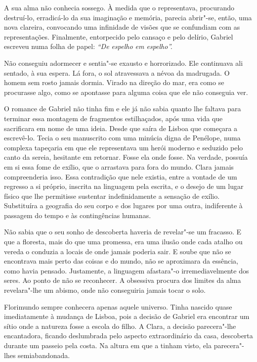 A sua alma não conhecia sossego. À medida que o representava, procurando
destruí-lo, erradicá-lo da sua imaginação e memória, parecia abrir"-se,
então, uma nova clareira, convocando uma infinidade de visões que se
confundiam com as representações. Finalmente, entorpecido pelo cansaço e
pelo delírio, Gabriel escreveu numa folha de papel: \emph{``De espelho
em espelho''.}

Não conseguiu adormecer e sentia"-se exausto e horrorizado. Ele
continuava ali sentado, à sua espera. Lá fora, o sol atravessava a névoa
da madrugada. O homem sem rosto jamais dormia. Virado na direção do
mar, era como se procurasse algo, como se apontasse para alguma coisa
que ele não conseguia ver.

O romance de Gabriel não tinha fim e ele já não sabia quanto lhe faltava
para terminar essa montagem de fragmentos estilhaçados, após uma vida
que sacrificara em nome de uma ideia. Desde que saíra de Lisboa que
começara a escrevê-lo. Tecia o seu manuscrito com uma minúcia digna de
Penélope, numa complexa tapeçaria em que ele representava um herói
moderno e seduzido pelo canto da sereia, hesitante em retornar. Fosse
ela onde fosse. Na verdade, possuía em si essa fome de exílio, que o
arrastava para fora do mundo. Clara jamais compreenderia isso. Essa
contradição que nele existia, entre a vontade de um regresso a si
próprio, inscrita na linguagem pela escrita, e o desejo de um lugar
físico que lhe permitisse sustentar indefinidamente a sensação de
exílio. Substituíra a geografia do seu corpo e dos lugares por uma
outra, indiferente à passagem do tempo e às contingências humanas.

Não sabia que o seu sonho de descoberta haveria de revelar"-se um
fracasso. E que a floresta, mais do que uma promessa, era uma ilusão
onde cada atalho ou vereda o conduzia a locais de onde jamais poderia
sair. E soube que não se encontrava mais perto das coisas e do mundo,
não se aproximara da essência, como havia pensado. Justamente, a
linguagem afastara"-o irremediavelmente dos seres. Ao ponto de não se
reconhecer. A obsessiva procura dos limites da alma revelara"-lhe um
abismo, onde não conseguiria jamais tocar o solo.

Florimundo sempre conhecera apenas aquele universo. Tinha nascido quase
imediatamente à mudança de Lisboa, pois a decisão de Gabriel era
encontrar um sítio onde a natureza fosse a escola do filho. A Clara, a
decisão parecera"-lhe encantadora, ficando deslumbrada pelo aspecto
extraordinário da casa, descoberta durante um passeio pela costa. Na
altura em que a tinham visto, ela parecera"-lhes semiabandonada.

